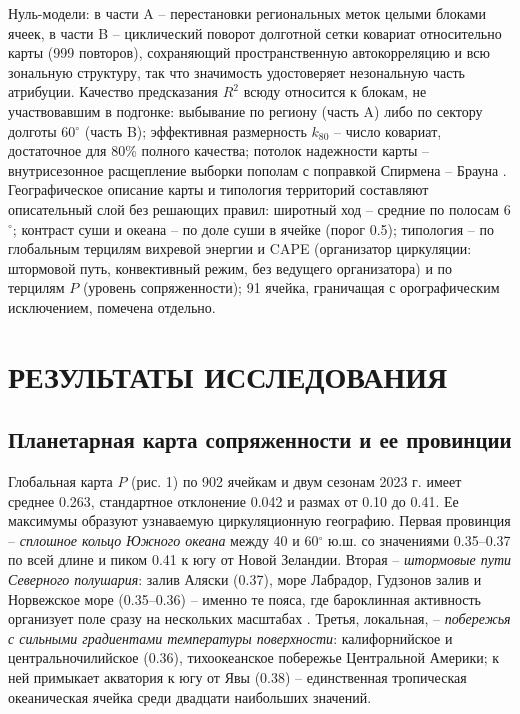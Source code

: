 \documentclass[12pt,a4paper]{article}
\begin{document}
Нуль-модели: в части A -- перестановки региональных меток целыми блоками ячеек, в части B -- циклический поворот долготной сетки ковариат относительно карты (999 повторов), сохраняющий пространственную автокорреляцию и всю зональную структуру, так что значимость удостоверяет незональную часть атрибуции. Качество предсказания $R^2$ всюду относится к блокам, не участвовавшим в подгонке: выбывание по региону (часть A) либо по сектору долготы 60$^\circ$ (часть B); эффективная размерность $k_{80}$ -- число ковариат, достаточное для 80\% полного качества; потолок надежности карты -- внутрисезонное расщепление выборки пополам с поправкой Спирмена -- Брауна \cite{Spearman1910,Brown1910}. Географическое описание карты и типология территорий составляют описательный слой без решающих правил: широтный ход -- средние по полосам 6$^\circ$; контраст суши и океана -- по доле суши в ячейке (порог 0.5); типология -- по глобальным терцилям вихревой энергии и CAPE (организатор циркуляции: штормовой путь, конвективный режим, без ведущего организатора) и по терцилям $P$ (уровень сопряженности); 91 ячейка, граничащая с орографическим исключением, помечена отдельно.

\section{РЕЗУЛЬТАТЫ ИССЛЕДОВАНИЯ}

\subsection{Планетарная карта сопряженности и ее провинции}

Глобальная карта $P$ (рис. 1) по 902 ячейкам и двум сезонам 2023 г. имеет среднее 0.263, стандартное отклонение 0.042 и размах от 0.10 до 0.41. Ее максимумы образуют узнаваемую циркуляционную географию. Первая провинция -- \emph{сплошное кольцо Южного океана} между 40 и 60$^\circ$ ю.ш. со значениями 0.35--0.37 по всей длине и пиком 0.41 к югу от Новой Зеландии. Вторая -- \emph{штормовые пути Северного полушария}: залив Аляски (0.37), море Лабрадор, Гудзонов залив и Норвежское море (0.35--0.36) -- именно те пояса, где бароклинная активность организует поле сразу на нескольких масштабах \cite{HoskinsValdes1990,Chang2002}. Третья, локальная, -- \emph{побережья с сильными градиентами температуры поверхности}: калифорнийское и центральночилийское (0.36), тихоокеанское побережье Центральной Америки; к ней примыкает акватория к югу от Явы (0.38) -- единственная тропическая океаническая ячейка среди двадцати наибольших значений.
\end{document}

